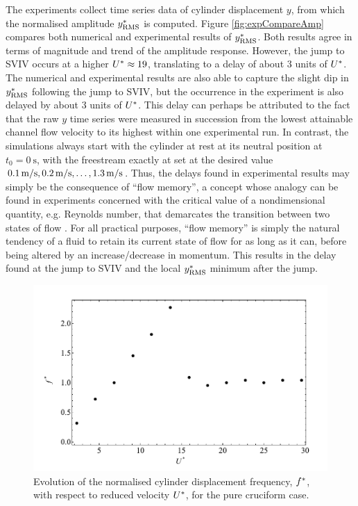 \documentclass[oneside]{utmthesis}
\begin{document}
The experiments collect time series data of cylinder displacement $y$, from which the normalised \rms{} amplitude $y^{*}_{\text{RMS}}$ is computed. Figure \ref{fig:expCompareAmp} compares both numerical and experimental results of $y^{*}_{\text{RMS}}$. Both results agree in terms of magnitude and trend of the amplitude response. However, the jump to SVIV occurs at a higher $U^{*} \approx 19$, translating to a delay of about 3 units of $U^{*}$. The numerical and experimental results are also able to capture the slight dip in $y^{*}_{\text{RMS}}$ following the jump to SVIV, but the occurrence in the experiment is also delayed by about 3 units of $U^{*}$. This delay can perhaps be attributed to the fact that the raw $y$ time series were measured in succession from the lowest attainable channel flow velocity \uth{} to its highest \uel{} within one experimental run. In contrast, the simulations always start with the cylinder at rest at its neutral position at $t_{0} = \SI{0}{\second}$, with the freestream exactly at set at the desired value $\uon, \utw, \dots, \utt$. Thus, the delays found in experimental results may simply be the consequence of ``flow memory'', a concept whose analogy can be found in experiments concerned with the critical value of a nondimensional quantity, e.g. Reynolds number, that demarcates the transition between two states of flow \citep{Saint-Michel2014,Rahman2015,Li2021}. For all practical purposes, ``flow memory'' is simply the natural tendency of a fluid to retain its current state of flow for as long as it can, before being altered by an increase/decrease in momentum. This results in the delay found at the jump to SVIV and the local $y^{*}_{\text{RMS}}$ minimum after the jump.

\begin{figure}
  \centering
  \includegraphics[width=1\textwidth]{figs/yStrFreq5}
  \caption{Evolution of the normalised cylinder displacement frequency, $f^{*}$, with respect to reduced velocity $U^{*}$, for the pure cruciform case.}
  \label{fig:yStrFreq5}
\end{figure}
\end{document}
